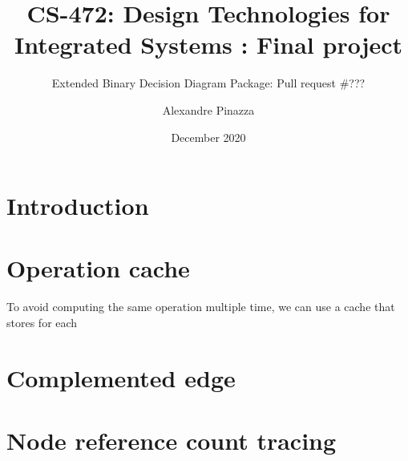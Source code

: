\documentclass[nonacm=true]{acmart}
\title{CS-472: Design Technologies for Integrated Systems : Final project}
\subtitle{Extended Binary Decision Diagram Package: Pull request \#???}
\author{Alexandre Pinazza}
\affiliation{
    \institution{IC, EPFL}
    \state{Vaud}
    \city{Lausanne}
    \country{Switzerland}
}
\date{December 2020}
\begin{document}
\maketitle
{}

\section{Introduction}

\section{Operation cache}
To avoid computing the same operation multiple time, we can use a cache that stores for each 

\section{Complemented edge}

\section{Node reference count tracing}

\listoftodos{}
\end{document}
